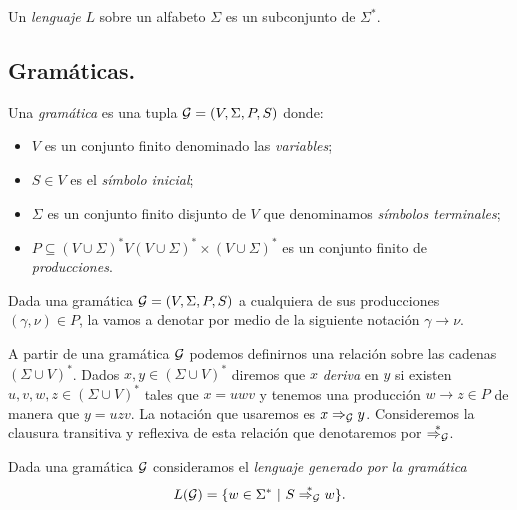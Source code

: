 \documentclass[tesis.tex]{subfiles}
\begin{document}
\begin{deff}
	Un \emph{lenguaje} $L$ sobre un alfabeto $\Sigma$ es un subconjunto de $\Sigma^*$.
\end{deff}




\subsection{Gramáticas.}

\begin{deff}
	Una \emph{gramática} es una tupla ${\cal G} = (V, \Sigma, P, S)$ donde:
	\begin{itemize}
		\item $V$ es un conjunto finito denominado las \emph{variables};
		\item $S \in V$ es el \emph{símbolo inicial};
		\item $\Sigma$ es un conjunto finito disjunto de $V$ que denominamos \emph{símbolos terminales};
		\item $P \subseteq (V \cup \Sigma)^*V(V \cup \Sigma)^* \times (V \cup \Sigma)^*$ es un conjunto finito de \emph{producciones}.
	\end{itemize}
\end{deff}

Dada una gramática ${\cal G} = (V, \Sigma, P, S)$ a cualquiera de sus producciones $(\gamma, \nu) \in P$, la vamos a denotar por medio de la siguiente notación $\gamma \to \nu$. 

A partir de una gramática $\cal G$ podemos definirnos una relación sobre las cadenas $(\Sigma \cup V)^*$. 
Dados $x,y \in (\Sigma \cup V)^*$ diremos que $x$ \emph{deriva} en $y$ si existen $u,v,w,z \in (\Sigma \cup V)^*$ tales que $x = uwv$ y tenemos una producción $w \to z \in P$ de manera que $y=uzv$.
La notación que usaremos es $x \Rightarrow_{\cal G} y$. 
Consideremos la clausura transitiva y reflexiva de esta relación que denotaremos por $\overset{*}{\Rightarrow_{\cal G}}$.



\begin{deff}
	Dada una gramática ${\cal G}$ consideramos el \emph{lenguaje generado por la gramática} 
	\[
	L({\cal G}) = \{ w \in \Sigma^* \ | \ S \overset{*}{\Rightarrow_{\cal G}} w   \}.
	\]
\end{deff}
\end{document}
